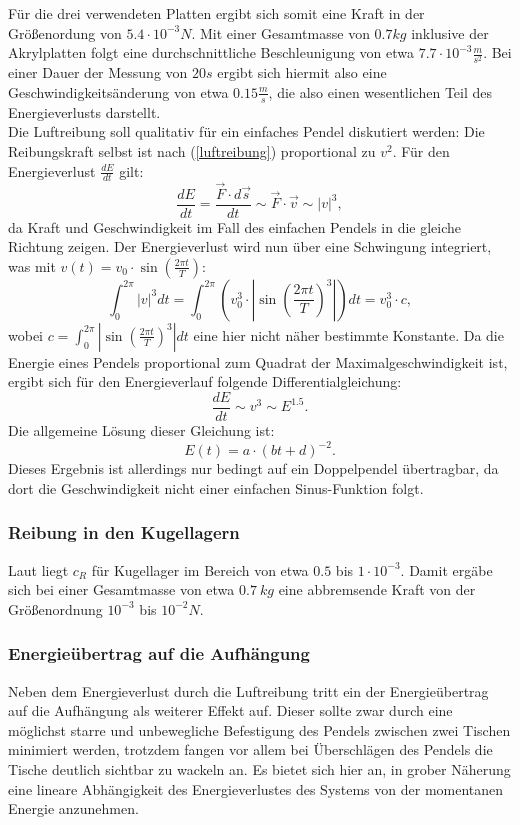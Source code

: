 Für die drei verwendeten Platten ergibt sich somit eine Kraft in der Größenordung von $ 5.4 \cdot 10^{-3}  N $. Mit einer Gesamtmasse von $0.7 kg$ inklusive der Akrylplatten folgt eine durchschnittliche Beschleunigung von etwa $ 7.7 \cdot 10^{-3} \frac{m}{s^2} $. Bei einer Dauer der Messung von $20 s$ ergibt sich hiermit also  eine Geschwindigkeitsänderung von etwa $ 0.15 \frac{m}{s} $, die also einen wesentlichen Teil des Energieverlusts darstellt. \\
Die Luftreibung soll qualitativ für ein einfaches Pendel diskutiert werden: Die Reibungskraft selbst ist nach (\ref{luftreibung}) proportional zu $v^2$. Für den Energieverlust $\frac{dE}{dt}$ gilt:
\begin{equation}
\frac{d E}{d t} = \frac{\vec{F} \cdot d\vec{s}}{dt} \sim  \vec{F} \cdot \vec{v} \sim |v|^3, 
\end{equation}
da Kraft und Geschwindigkeit im Fall des einfachen Pendels in die gleiche Richtung zeigen. 
Der Energieverlust wird nun über eine Schwingung integriert, was mit $ v(t) = v_0 \cdot \sin(\frac{2 \pi t}{T})$:
\begin{equation}
\int _0^{2\pi} |v|^3 dt = \int _0^{2\pi}( v_0^3 \cdot |\sin(\frac{2 \pi t}{T})^3|)dt = v_0^3 \cdot c,
\end{equation}
wobei $ c = \int _0^{2\pi} |\sin(\frac{2 \pi t}{T})^3|dt $ eine hier nicht näher bestimmte Konstante. 
Da die Energie eines Pendels proportional zum Quadrat der Maximalgeschwindigkeit ist, ergibt sich für den Energieverlauf folgende Differentialgleichung: 
\begin{equation}
\frac{dE}{dt} \sim v^3 \sim E^{1.5}. 
\end{equation}
Die allgemeine Lösung dieser Gleichung ist: 
\begin{equation}
E(t) = a \cdot (bt + d)^{-2}. 
\end{equation}
Dieses Ergebnis ist allerdings nur bedingt auf ein Doppelpendel übertragbar, da dort die Geschwindigkeit nicht einer einfachen Sinus-Funktion folgt. 

\subsubsection{Reibung in den Kugellagern}
Laut \cite{wiki} liegt $ c_R $ für Kugellager im Bereich von etwa 
$ 0.5 $ bis $ 1 \cdot 10^{-3} $. 
Damit ergäbe sich bei einer Gesamtmasse von etwa $ 0.7 \  kg  $ eine abbremsende Kraft von der Größenordnung $ 10^{-3} $ bis $ 10^{-2} N $. 

\subsubsection{Energieübertrag auf die Aufhängung}
Neben dem Energieverlust durch die Luftreibung tritt ein der Energieübertrag auf die Aufhängung als weiterer Effekt auf. Dieser sollte zwar durch eine möglichst starre und unbewegliche Befestigung des Pendels zwischen zwei Tischen minimiert werden, trotzdem fangen vor allem bei Überschlägen des Pendels die Tische deutlich sichtbar zu wackeln an. 
Es bietet sich hier an, in grober Näherung eine lineare Abhängigkeit des Energieverlustes des Systems von der momentanen Energie anzunehmen. 

